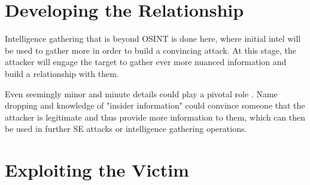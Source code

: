 




\section{Developing the Relationship}
\begin{comment}
    
    - Engaging the target with the gathered info and fabricated pretext
    - Choosing the right timing
    - Practicing the engagement
    - Creating the strategy for engagement
    - Create a strategy, plan on how to exploit found weaknesses
    - Create a persona, a pretext with a convincing message
    - Choosing the right attack method
    - AI can help craft highly convincing messages, including the development of the persona (pretext)
    - Deepfake tech, chatbots etc
    - AI can analyze and predict the most suitable times and methods for an attack based on gathered intel

\end{comment}



Intelligence gathering that is beyond OSINT is done here, where initial intel will be used to gather more in order to build a convincing attack. At this stage, the attacker will engage the target to gather ever more nuanced information and build a relationship with them.


Even seemingly minor and minute details could play a pivotal role \citep{mitnickArtDeceptionControlling2003}. Name dropping and knowledge of "insider information" could convince someone that the attacker is legitimate and thus provide more information to them, which can then be used in further SE attacks or intelligence gathering operations.

 





\section{Exploiting the Victim}
\begin{comment}
    
    - 

\end{comment}

